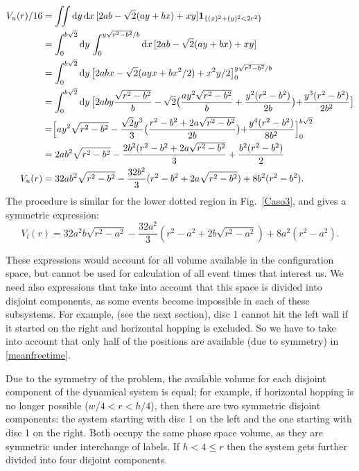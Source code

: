\documentclass[superscriptaddress,pre,reprint,showpacs,twocolumn]{revtex4-1}
\newcommand{\rd}[1]{\mathrm{d}{#1} \,}
\newcommand{\indicatorsymbol}{\mathbf{1}}
\newcommand{\indicator}[1]{\indicatorsymbol_{ \{   #1 \} } }
\begin{document}
\begin{widetext}
\begin{equation}
  \begin{split}
    V_{u}(r) /16 &=\iint \rd y \rd x [2ab-\sqrt{2}(ay+bx)+xy] \indicator{(x)^2+(y)^2<2r^2 }\\
    &=\int_0^{b\sqrt{2}}\rd y \int_{0}^{y\sqrt{r^2-b^2}/b} \rd x [2ab-\sqrt{2}(ay+bx)+xy] \\
   &=\int_0^{b\sqrt{2}}\rd y \bigl[2abx-\sqrt{2}(ayx+bx^2/2)+x^2y/2\bigr]_{0}^{y\sqrt{r^2-b^2}/b} \\
      &=\int_0^{b\sqrt{2}}\rd y
        \bigr[
          2aby\frac{\sqrt{r^2-b^2}}{b}
          -\sqrt{2}
          \bigr(
          \frac{ay^2\sqrt{r^2-b^2}}{b}
            +\frac{y^2(r^2-b^2)}{2b}
            \bigl)
           +\frac{y^3(r^2-b^2)}{2b^2}
           \bigl]\\
        &= \Bigr[ay^2\sqrt{r^2-b^2}-
          \frac{\sqrt{2}y^3}{3}
          \bigr(
          \frac{r^2-b^2+2a\sqrt{r^2-b^2}}{2b}
            \bigl)
            +\frac{y^4(r^2-b^2)}{8b^2}
            \Bigl]_0^{b\sqrt{2}}\\
          &=2ab^2\sqrt{r^2-b^2}
          -\frac{2b^2(r^2-b^2+2a\sqrt{r^2-b^2}}{3}+\frac{b^2(r^2-b^2)}{2}\\
          V_{u}(r)&=32ab^2\sqrt{r^2-b^2} -\frac{32
            b^2}{3}(r^2-b^2+2a\sqrt{r^2-b^2}) +8b^2(r^2-b^2).
  \end{split}
  \end{equation}
The procedure is similar for the lower dotted  region in Fig.~\ref{Caso3},
and gives a symmetric expression:
\begin{equation}
          V_{l}(r)=32a^2b\sqrt{r^2-a^2} -\frac{32
            a^2}{3}(r^2-a^2+2b\sqrt{r^2-a^2}) +8a^2(r^2-a^2).
\end{equation}
\end{widetext}

These expressions would account for all volume available in the configuration space, but
cannot be used for calculation of all event times that interest us. We need also
expressions that take into account that this space is divided into disjoint components,
as some events become impossible in each of these subsystems. For example,
(see the next section), disc 1 cannot hit the left wall if
it started on the right and horizontal hopping is excluded. So we have to
take into account that only half of the positions are available (due to symmetry)
 in \eqref{meanfreetime}.

Due to the symmetry of the problem, the available volume
for each disjoint component of the dynamical system is equal; for example, if horizontal hopping is no longer possible
($w/4<r<h/4$), then there are two symmetric disjoint components: the system
starting with disc 1 on the left and the one starting with disc 1 on
the right. Both occupy the same phase space volume, as they are
symmetric under interchange of labels. If $h<4\leq r$ then the system gets further
divided into four disjoint components. 
\end{document}
